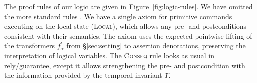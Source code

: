 The proof rules of our logic are given in Figure~\ref{fig:logic-rules}.  We have
omitted the more standard rules \tra{\ref{app:formal}}{\nformal}.  We have a
single axiom for primitive commands executing on the local state
(\textsc{Local}), which allows any pre- and postconditions consistent with their
semantics. The axiom uses the expected pointwise lifting of the transformers
$f_\alpha^t$ from \S\ref{sec:setting} to assertion denotations, preserving the
interpretation of logical variables. The \textsc{Conseq} rule looks as usual in
rely/guarantee, except it allows strengthening the pre- and postcondition with
the information provided by the temporal invariant $\Upsilon$.




 


 


